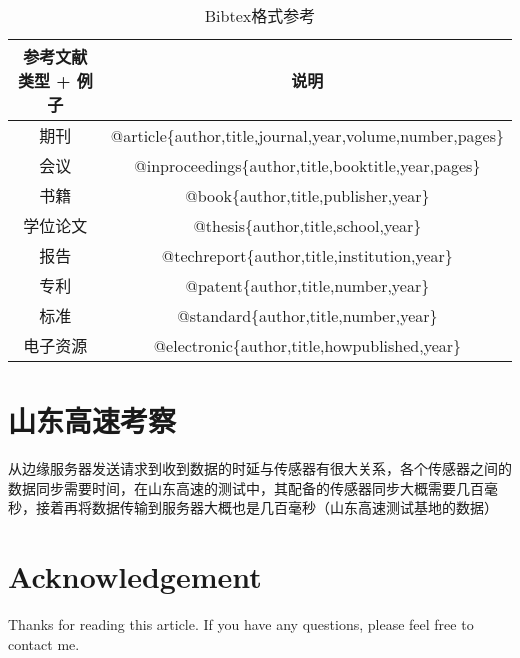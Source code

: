 \documentclass[12pt,a4paper]{article}%
\begin{document}
	\begin{table}[h!]
		\begin{center}
			\caption{Bibtex格式参考}
			\begin{tabular}{|c|c|}
				\hline
				\textbf{参考文献类型 + 例子} & \textbf{说明} \\
				\hline
				期刊 & @article\{author,title,journal,year,volume,number,pages\} \\
				\hline
				会议 & @inproceedings\{author,title,booktitle,year,pages\} \\
				\hline
				书籍 & @book\{author,title,publisher,year\} \\
				\hline
				学位论文 & @thesis\{author,title,school,year\} \\
				\hline
				报告 & @techreport\{author,title,institution,year\} \\
				\hline
				专利 & @patent\{author,title,number,year\} \\
				\hline
				标准 & @standard\{author,title,number,year\} \\
				\hline
				电子资源 & @electronic\{author,title,howpublished,year\} \\
				\hline
			\end{tabular}
		\end{center}
	\end{table}
	\section{山东高速考察}
	从边缘服务器发送请求到收到数据的时延与传感器有很大关系，各个传感器之间的数据同步需要时间，在山东高速的测试中，其配备的传感器同步大概需要几百毫秒，接着再将数据传输到服务器大概也是几百毫秒（山东高速测试基地的数据）
    
	\section{Acknowledgement}
	Thanks for reading this article. If you have any questions, please feel free to contact me.
\end{document}
